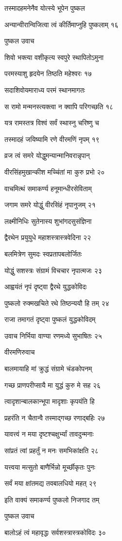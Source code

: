 तस्मादहमनेनैव योत्स्ये भूपेन पुष्कल

अन्यान्वीरान्विजित्वा त्वं कीर्तिमाप्नुहि पुष्कलाम् १६

पुष्कल उवाच

शिवो भक्त्या वशीकृत्य स्वपुरे स्थापितोऽमुना

परमस्याशु हृदयेन तिष्ठति महेश्वरः १७

सदाशिवोयमाराध्य परमं स्थानमागतः

स रामो मन्मनस्त्यक्त्वा न क्वापि परिगच्छति १८

यत्र रामस्तत्र विश्वं सर्वं स्थास्नु चरिष्णु च

तस्मादहं जयिष्यामि रणे वीरमणिं नृपम् १९

व्रज त्वं समरे योद्धुमन्यान्मानिवरान्नृपान्

वीरसिंहमुखान्कीश मच्चिंतां मा कुरु प्रभो २०

वाचमित्थं समाकर्ण्य हनूमान्धीरसेविताम्

जगाम समरे योद्धुं वीरसिंहं नृपानुजम् २१

लक्ष्मीनिधिः सुतेनास्य शुभांगदसुसंज्ञिना

द्वैरथेन प्रयुयुधे महाशस्त्रास्त्रवेदिना २२

बलमित्रेण सुमदः स्वप्रतापबलोर्जितः

योद्धुं सशस्त्रः संग्रामं विचचार नृपात्मजः २३

आह्वयंतं नृपं दृष्ट्वा द्वैरथे युद्धकोविदः

पुष्कलो रुक्मखचिते रथे तिष्ठन्ययौ हि तम् २४

राजा तमागतं दृष्ट्वा पुष्कलं युद्धकोविदम्

उवाच निर्भिया वाण्या रणमध्ये सुभाषितः २५

वीरमणिरुवाच

बालमायाहि मां क्रुद्धं संग्रामे चंडकोपनम्

गच्छ प्राणपरीप्सायै मा युद्धं कुरु मे सह २६

त्वादृशान्बालकान्भूपा मादृशाः कृपयंति हि

प्रहरंति न चैतान्वै तस्माद्गच्छ रणाद्बहिः २७

यावत्त्वं न मया दृष्टश्चक्षुर्भ्यां तावदुन्मनाः

सांप्रतं त्वां प्रहर्तुं न मनः समभिकांक्षति २८

यत्त्वया मत्सुतो बाणैर्भिन्नो मूर्च्छीकृतः पुनः

सर्वं मया क्षांतमद्य तवबालधियो महत् २९

इति वाक्यं समाकर्ण्य पुष्कलो निजगाद तम्

पुष्कल उवाच

बालोऽहं त्वं महावृद्धः सर्वशस्त्रास्त्रकोविदः ३०

